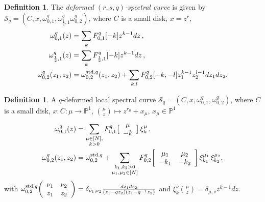 \documentclass[reqno,11pt]{amsart}
\theoremstyle{plain}
\theoremstyle{definition}
\newtheorem{definition}[theorem]{Definition}
\theoremstyle{remark}
\numberwithin{equation}{section}
\newcommand{\1}{\mathds{1}}
\newcommand{\2}{\frac{1}{2}}
\begin{document}
{								\begin{definition}\label{d:rsdeformed}
									The \emph{deformed $(r,s,q)$-spectral curve} is given by $\mathcal{S}_q = (C, x, \omega^{q}_{0,1}, \omega^{q}_{\frac{1}{2},1} \omega^{q}_{0,2} ) $, where $C$ is a small disk, $x=z^r$,
									\begin{align}
										\omega^{q}_{0,1} (z)
										&= 
										\sum_k F^{q}_{0,1} [-k] z^{k-1} dz\label{q1} \,,
										\\
										\omega^{q}_{\frac{1}{2},1} (z)
										&=
										\sum_k F^{q}_{\frac{1}{2},1} [-k] z^{k-1} dz\label{q2} \,,
										\\
										\omega^{q}_{0,2} (z_1, z_2)
										&=
										\omega^{\textup{std},q}_{0,2} (z_1, z_2) + \sum_{k,l} F^{q}_{0,2}[-k,-l] z_1^{k-1} z_2^{l-1} dz_1 dz_2\label{q3}.
								\end{align}\end{definition}
								{\begin{definition}
										A $q$-deformed local spectral curve	$\mathcal{S}_q = (C, x, \omega^q_{0,1}, \omega^q_{0,2} ) $, where $C$ is a small disk, $x: C:{\mu} \longrightarrow \mathbb{P}^1$, $ \binom{\mu}{z}\mapsto z^{r_{\mu}}+x_{\mu}$, $x_{\mu}\in \mathbb{P}^1$
										\begin{align}
											\omega^q_{0,1} (z)
											&= 
											\sum_{\substack{\mu\in [N],\\ k> 0}}F^q_{0,1}\big[\begin{array}{c} \mu \\ -k\end{array} \big]\,\xi^{\mu}_k  \,,
											\\
											\omega^q_{0,2} (z_1, z_2)
											&=
											\omega^{\textup{std},q}_{0,2}  + \sum_{\substack{k_1,k_2>0\\ \mu_1,\mu_2\in[N]}} F^q_{0,2}\bigg[\begin{array}{cc} \mu_1 & \mu_2 \\ -k_1 & -k_2\end{array} \bigg]\,\xi^{\mu_1}_{k_1}\,\xi^{\mu_2}_{k_2},
										\end{align}
										with $\omega^{\textup{std},q}_{0,2}\bigg(\begin{array}{cc} \nu_1 & \nu_2 \\ z_1 & z_2\end{array} \bigg)=\delta_{\nu_1,\nu_2}\frac{dz_1 dz_2}{(z_1 - qz_2)(z_1-q^{-1}z_2)}$ and $\xi^{\nu}_k\binom{\mu}{z}=\delta_{\mu,\nu}z^{k-1} dz$.\end{definition}}
}
\end{document}
